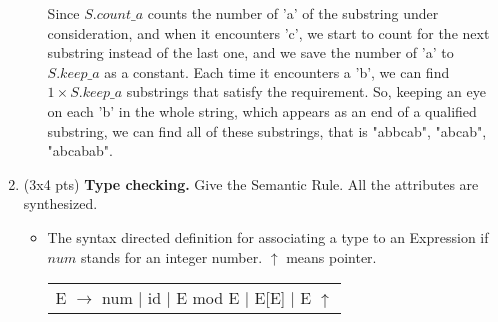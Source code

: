 \documentclass[10pt]{article}
\begin{document}
\begin{enumerate}
\begin{itemize}
{\begin{center}
\end{center}
                        Since $S.count\_a$ counts the number of 'a' of the substring under consideration, and when it encounters 'c', we start to count for the next substring instead of the last one, and we save the number of 'a' to $S.keep\_a$ as a constant. Each time it encounters a 'b', we can find $1\times S.keep\_a$ substrings that satisfy the requirement. So, keeping an eye on each 'b' in the whole string, which appears as an end of a qualified substring, we can find all of these substrings, that is "abbcab", "abcab", "abcabab".
                    }
          \end{itemize}
    \item (3x4 pts) \textbf{Type checking.} Give the Semantic Rule.  All the attributes are synthesized.
          \begin{itemize}
              \item The syntax directed definition for associating a type to an Expression if $num$ stands for an
                    integer number. $\uparrow$ means pointer.
                    \begin{table}[h]
                        \centering
                        \begin{tabular}{l}
                            E $\rightarrow$ num $\big|$ id $\big|$  E mod E $\big|$ E{[}E{]} $\big|$ E $\uparrow$
                        \end{tabular}
                    \end{table}


\end{itemize}
\end{enumerate}
\end{document}
